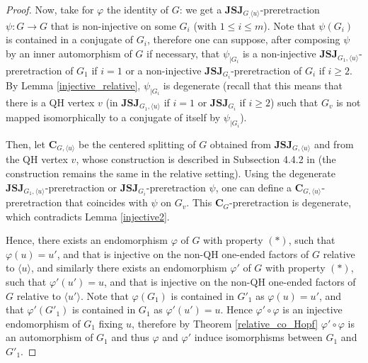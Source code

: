 \documentclass[a4paper, 11pt]{amsart}
\theoremstyle{definition}
\theoremstyle{remark}
\renewcommand{\leq}{\leqslant}
\renewcommand{\geq}{\geqslant}
\begin{document}
\begin{proof}


\smallskip \noindent
Now, take for $\varphi$ the identity of $G$: we get a $\mathbf{JSJ}_{G_,\langle u\rangle}$-preretraction $\psi : G \rightarrow G$ that is non-injective on some $G_i$ (with $1\leq i\leq m$). Note that $\psi(G_i)$ is contained in a conjugate of $G_i$, therefore one can suppose, after composing $\psi$ by an inner automorphism of $G$ if necessary, that $\psi_{\vert G_i}$ is a non-injective $\mathbf{JSJ}_{G_1,\langle u\rangle}$-preretraction of $G_1$ if $i=1$ or a non-injective $\mathbf{JSJ}_{G_i}$-preretraction of $G_i$ if $i\geq 2$. By Lemma \ref{injective_relative}, $\psi_{\vert G_i}$ is degenerate (recall that this means that there is a QH vertex $v$ (in $\mathbf{JSJ}_{G_1,\langle u\rangle}$ if $i=1$ or $\mathbf{JSJ}_{G_i}$ if $i\geq 2$) such that $G_v$ is not mapped isomorphically to a conjugate of itself by $\psi_{\vert G_i}$).

\smallskip \noindent
Then, let $\mathbf{C}_{G,\langle u\rangle}$ be the centered splitting of $G$ obtained from $\mathbf{JSJ}_{G,\langle u\rangle}$ and from the QH vertex $v$, whose construction is described in Subsection 4.4.2 in \cite{AP24} (the construction remains the same in the relative setting). Using the degenerate $\mathbf{JSJ}_{G_1,\langle u\rangle}$-preretraction or $\mathbf{JSJ}_{G_i}$-preretraction $\psi$, one can define a $\mathbf{C}_{G,\langle u\rangle}$-preretraction that coincides with $\psi$ on $G_v$. This $\mathbf{C}_G$-preretraction is degenerate, which contradicts Lemma \ref{injective2}.

\smallskip \noindent
Hence, there exists an endomorphism $\varphi$ of $G$ with property $(\ast)$, such that $\varphi(u)=u'$, and that is injective on the non-QH one-ended factors of $G$ relative to $\langle u\rangle$, and similarly there exists an endomorphism $\varphi'$ of $G$ with property $(\ast)$, such that $\varphi'(u')=u$, and that is injective on the non-QH one-ended factors of $G$ relative to $\langle u'\rangle$. Note that $\varphi(G_1)$ is contained in $G'_1$ as $\varphi(u)=u'$, and that $\varphi'(G'_1)$ is contained in $G_1$ as $\varphi'(u')=u$. Hence $\varphi'\circ \varphi$ is an injective endomorphism of $G_1$ fixing $u$, therefore by Theorem \ref{relative_co_Hopf} $\varphi'\circ \varphi$ is an automorphism of $G_1$ and thus $\varphi$ and $\varphi'$ induce isomorphisms between $G_1$ and $G'_1$.


\end{proof}
\end{document}
